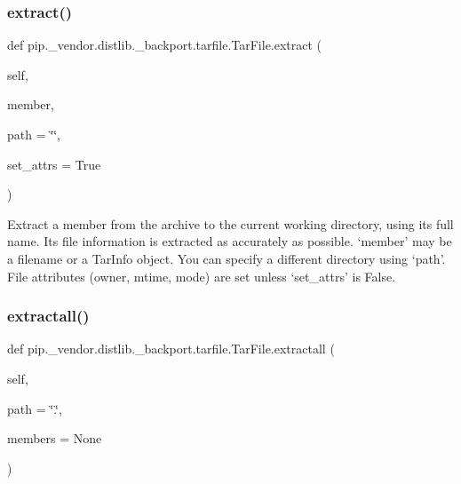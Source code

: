 \subsubsection{\texorpdfstring{extract()}{extract()}}
{\footnotesize\ttfamily def pip.\+\_\+vendor.\+distlib.\+\_\+backport.\+tarfile.\+Tar\+File.\+extract (\begin{DoxyParamCaption}\item[{}]{self,  }\item[{}]{member,  }\item[{}]{path = {\ttfamily \char`\"{}\char`\"{}},  }\item[{}]{set\+\_\+attrs = {\ttfamily True} }\end{DoxyParamCaption})}

\begin{DoxyVerb}Extract a member from the archive to the current working directory,
   using its full name. Its file information is extracted as accurately
   as possible. `member' may be a filename or a TarInfo object. You can
   specify a different directory using `path'. File attributes (owner,
   mtime, mode) are set unless `set_attrs' is False.
\end{DoxyVerb}
 \mbox{\label{classpip_1_1__vendor_1_1distlib_1_1__backport_1_1tarfile_1_1TarFile_a4b5763d1d14190f34cf9654c77d903eb}} 
\subsubsection{\texorpdfstring{extractall()}{extractall()}}
{\footnotesize\ttfamily def pip.\+\_\+vendor.\+distlib.\+\_\+backport.\+tarfile.\+Tar\+File.\+extractall (\begin{DoxyParamCaption}\item[{}]{self,  }\item[{}]{path = {\ttfamily \char`\"{}.\char`\"{}},  }\item[{}]{members = {\ttfamily None} }\end{DoxyParamCaption})}

